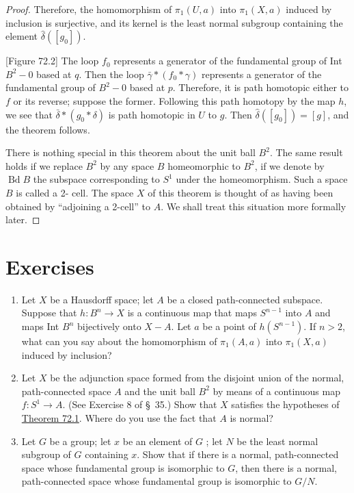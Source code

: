 \begin{proof}
Therefore, the homomorphism of \({\pi }_{1}( {U,a})\) into \({\pi }_{1}( {X,a})\) induced by inclusion is surjective, and its kernel is the least normal subgroup containing the element \(\hat{\delta }( [ g_{0}] )\).

[Figure 72.2]
The loop \(f_{0}\) represents a generator of the fundamental group of Int \(B^{2} - 0\) based at \(q\). Then the loop \(\bar{\gamma } * ( {f_{0} * \gamma })\) represents a generator of the fundamental group of \(B^{2} - 0\) based at \(p\). Therefore, it is path homotopic either to \(f\) or its reverse; suppose the former. Following this path homotopy by the map \(h\), we see that \(\bar{\delta } * ( {g_{0} * \delta })\) is path homotopic in \(U\) to \(g\). Then \(\hat{\delta }( [ g_{0}] ) = [ g]\), and the theorem follows.

There is nothing special in this theorem about the unit ball \(B^{2}\). The same result holds if we replace \(B^{2}\) by any space \(B\) homeomorphic to \(B^{2}\), if we denote by \(\operatorname{Bd}B\) the subspace corresponding to \(S^{1}\) under the homeomorphism. Such a space \(B\) is called a 2- cell. The space \(X\) of this theorem is thought of as having been obtained by ``adjoining a 2-cell'' to \(A\). We shall treat this situation more formally later.
\end{proof}
\section*{Exercises}
\begin{enumerate}[itemsep=0.4em, parsep=0pt, topsep=0pt, partopsep=0pt, leftmargin=*, label=\arabic*., ref=\arabic*]
\item Let \(X\) be a Hausdorff space; let \(A\) be a closed path-connected subspace. Suppose that \(h : B^{n} \rightarrow X\) is a continuous map that maps \(S^{n - 1}\) into \(A\) and maps Int \(B^{n}\) bijectively onto \(X - A\). Let \(a\) be a point of \(h( S^{n - 1})\). If \(n > 2\), what can you say about the homomorphism of \({\pi }_{1}( {A,a})\) into \({\pi }_{1}( {X,a})\) induced by inclusion?
\item Let \(X\) be the adjunction space formed from the disjoint union of the normal, path-connected space \(A\) and the unit ball \(B^{2}\) by means of a continuous map \(f : S^{1} \rightarrow A\). (See Exercise 8 of \S\ 35.) Show that \(X\) satisfies the hypotheses of \hyperref[thm:72.1]{Theorem 72.1}. Where do you use the fact that \(A\) is normal?
\item Let \(G\) be a group; let \(x\) be an element of \(G\) ; let \(N\) be the least normal subgroup of \(G\) containing \(x\). Show that if there is a normal, path-connected space whose fundamental group is isomorphic to \(G\), then there is a normal, path-connected space whose fundamental group is isomorphic to \(G/N\).
\end{enumerate}


